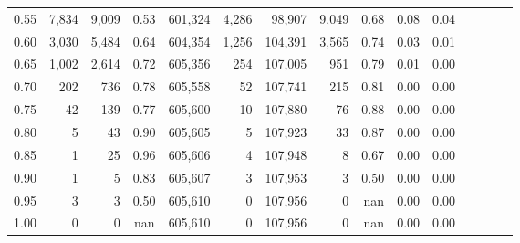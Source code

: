 \begin{tabular}{rrrcrrrrrrrrrrr}
0.55 &    7,834 &   9,009 &                                       0.53 &  601,324 &    4,286 &   98,907 &    9,049 &  0.68 &  0.08 &                         0.04 \\
0.60 &    3,030 &   5,484 &                                       0.64 &  604,354 &    1,256 &  104,391 &    3,565 &  0.74 &  0.03 &                         0.01 \\
0.65 &    1,002 &   2,614 &                                       0.72 &  605,356 &      254 &  107,005 &      951 &  0.79 &  0.01 &                         0.00 \\
0.70 &      202 &     736 &                                       0.78 &  605,558 &       52 &  107,741 &      215 &  0.81 &  0.00 &                         0.00 \\
0.75 &       42 &     139 &                                       0.77 &  605,600 &       10 &  107,880 &       76 &  0.88 &  0.00 &                         0.00 \\
0.80 &        5 &      43 &                                       0.90 &  605,605 &        5 &  107,923 &       33 &  0.87 &  0.00 &                         0.00 \\
0.85 &        1 &      25 &                                       0.96 &  605,606 &        4 &  107,948 &        8 &  0.67 &  0.00 &                         0.00 \\
0.90 &        1 &       5 &                                       0.83 &  605,607 &        3 &  107,953 &        3 &  0.50 &  0.00 &                         0.00 \\
0.95 &        3 &       3 &                                       0.50 &  605,610 &        0 &  107,956 &        0 &   nan &  0.00 &                         0.00 \\
1.00 &        0 &       0 &                                        nan &  605,610 &        0 &  107,956 &        0 &   nan &  0.00 &                         0.00 \\
\bottomrule
\end{tabular}
